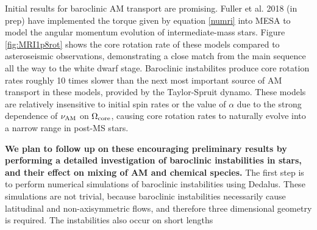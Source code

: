 Initial results for baroclinic AM transport are promising. Fuller et al. 2018 (in prep) have implemented the torque given by equation \ref{numri} into MESA to model the angular momentum evolution of intermediate-mass stars. Figure \ref{fig:MRI1p8rot} shows the core rotation rate of these models compared to asteroseismic observations, demonstrating a close match from the main sequence all the way to the white dwarf stage. Baroclinic instabilites produce core rotation rates roughly 10 times slower than the next most important source of AM transport in these models, provided by the Taylor-Spruit dynamo. These models are relatively insensitive to initial spin rates or the value of $\alpha$ due to the strong dependence of $\nu_{\rm AM}$ on $\Omega_{\rm core}$, causing core rotation rates to naturally evolve into a narrow range in post-MS stars.

{\bf We plan to follow up on these encouraging preliminary results by performing a detailed investigation of baroclinic instabilities in stars, and their effect on mixing of AM and chemical species.} The first step is to perform numerical simulations of baroclinic instabilities using Dedalus. These simulations are not trivial, because baroclinic instabilities necessarily cause latitudinal and non-axisymmetric flows, and therefore three dimensional geometry is required. The instabilities also occur on short lengths
